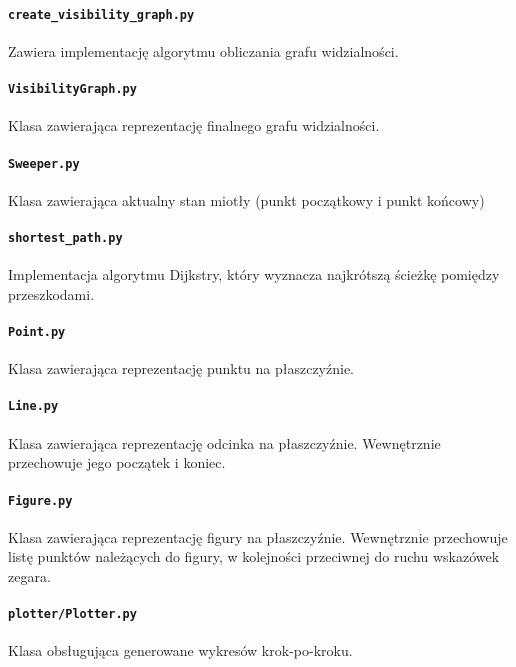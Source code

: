 \documentclass[12pt]{article}
\begin{document}
		\paragraph{\lstinline|create_visibility_graph.py|}
			Zawiera implementację algorytmu obliczania grafu widzialności.
		
		\paragraph{\lstinline|VisibilityGraph.py|}
			Klasa zawierająca reprezentację finalnego grafu widzialności.
		
		\paragraph{\lstinline|Sweeper.py|}
			Klasa zawierająca aktualny stan miotły (punkt początkowy i punkt końcowy)
		
		\paragraph{\lstinline|shortest_path.py|}
			Implementacja algorytmu Dijkstry, który wyznacza najkrótszą ścieżkę pomiędzy przeszkodami.
		
		\paragraph{\lstinline|Point.py|}
			Klasa zawierająca reprezentację punktu na płaszczyźnie.
			
		\paragraph{\lstinline|Line.py|}
			Klasa zawierająca reprezentację odcinka na płaszczyźnie. Wewnętrznie przechowuje jego początek i koniec.
					
		\paragraph{\lstinline|Figure.py|}
			Klasa zawierająca reprezentację figury na płaszczyźnie. Wewnętrznie przechowuje listę punktów należących do figury, w kolejności przeciwnej do ruchu wskazówek zegara.
		
		\paragraph{\lstinline|plotter/Plotter.py|}
			Klasa obsługująca generowane wykresów krok-po-kroku.
			
\end{document}
